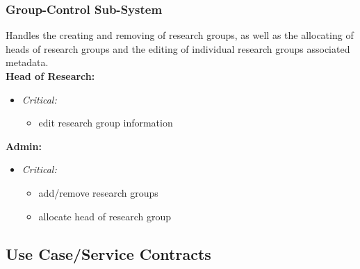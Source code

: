 \documentclass{article}
\begin{document}
			\subsubsection{Group-Control Sub-System}\label{subsubsec:priority-group}
				Handles the creating and removing of research groups, as well as the allocating of heads of research groups and the editing of individual research groups associated metadata.\\
				[3mm]
				\textbf{Head of Research:}
				\begin{itemize}					
					\item \textit{Critical:}
					\begin{itemize}
						\item edit research group information
					\end{itemize}
				\end{itemize}
				\textbf{Admin:}
				\begin{itemize}
					\item \textit{Critical:}
					\begin{itemize}
						\item add/remove research groups
						\item allocate head of research group
					\end{itemize}
				\end{itemize}
			
		\cleardoublepage
		\subsection{Use Case/Service Contracts}\label{subsec:usecasepriorotization}
\end{document}
